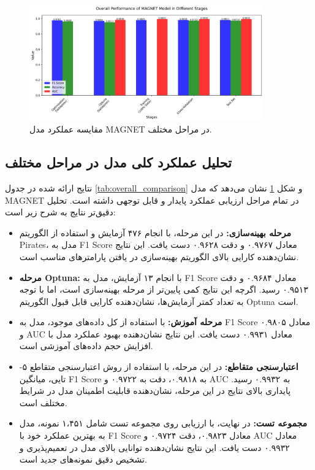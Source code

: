 \begin{figure}[h!]
    \centering
    \includegraphics[width=0.9\textwidth]{fig_overall_comparison}
    \caption{مقایسه عملکرد مدل MAGNET در مراحل مختلف.}
    \label{fig:overall_comparison}
\end{figure}

\subsection{تحلیل عملکرد کلی مدل در مراحل مختلف}
نتایج ارائه شده در جدول \ref{tab:overall_comparison} و شکل \ref{fig:overall_comparison} نشان می‌دهد که مدل MAGNET در تمام مراحل ارزیابی عملکرد پایدار و قابل توجهی داشته است. تحلیل دقیق‌تر نتایج به شرح زیر است:

\begin{itemize}
    \item \textbf{مرحله بهینه‌سازی:} در این مرحله، با انجام ۴۷۶ آزمایش و استفاده از الگوریتم Pirates، مدل به F1 Score معادل ۰.۹۷۶۷ و دقت ۰.۹۶۲۸ دست یافت. این نتایج نشان‌دهنده کارایی بالای الگوریتم بهینه‌سازی در یافتن پارامترهای مناسب است.
    
    \item \textbf{مرحله Optuna:} با انجام ۱۳ آزمایش، مدل به F1 Score معادل ۰.۹۶۸۴ و دقت ۰.۹۵۱۳ رسید. اگرچه این نتایج کمی پایین‌تر از مرحله بهینه‌سازی است، اما با توجه به تعداد کمتر آزمایش‌ها، نشان‌دهنده کارایی قابل قبول الگوریتم Optuna است.
    
    \item \textbf{مرحله آموزش:} با استفاده از کل داده‌های موجود، مدل به F1 Score معادل ۰.۹۸۰۵ و AUC معادل ۰.۹۹۳۱ دست یافت. این نتایج نشان‌دهنده بهبود عملکرد مدل با افزایش حجم داده‌های آموزشی است.
    
    \item \textbf{اعتبارسنجی متقاطع:} در این مرحله، با استفاده از روش اعتبارسنجی متقاطع ۵-تایی، میانگین F1 Score به ۰.۹۸۱۸، دقت به ۰.۹۷۲۲ و AUC به ۰.۹۹۳۲ رسید. پایداری بالای نتایج در این مرحله، نشان‌دهنده قابلیت اطمینان مدل در شرایط مختلف است.
    
    \item \textbf{مجموعه تست:} در نهایت، با ارزیابی روی مجموعه تست شامل ۱،۴۵۱ نمونه، مدل به بهترین عملکرد خود با F1 Score معادل ۰.۹۸۲۳، دقت ۰.۹۷۲۴ و AUC معادل ۰.۹۹۳۲ دست یافت. این نتایج نشان‌دهنده توانایی بالای مدل در تعمیم‌پذیری و تشخیص دقیق نمونه‌های جدید است.
\end{itemize}

